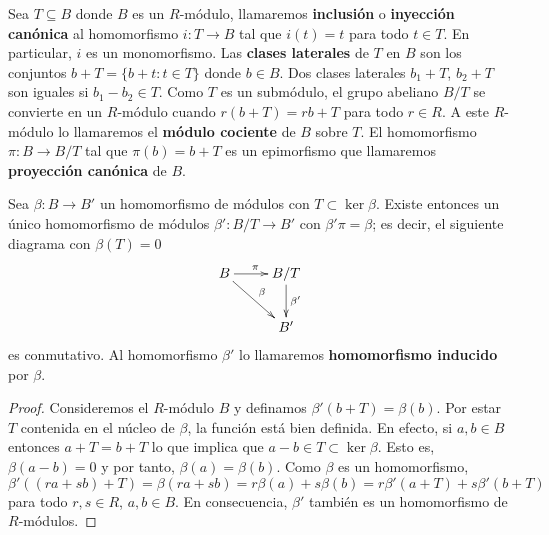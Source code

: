 Sea \(T \subseteq B\) donde \(B\) es un \(R\)-módulo, llamaremos \textbf{inclusión} o \textbf{inyección
canónica} al homomorfismo \(i: T \rightarrow B\) tal que \(i(t) = t\) para todo
\(t \in T\). En particular, \(i\) es un monomorfismo. Las \textbf{clases laterales}
de \(T\) en \(B\) son los conjuntos \(b + T = \{b + t : t \in T\}\) donde \(b \in B\). Dos
clases laterales \(b_{1} + T\), \(b_{2} + T\) son iguales si \(b_{1} - b_{2} \in T\). Como
\(T\) es un submódulo, el grupo abeliano \(B/T\) se convierte en un \(R\)-módulo
cuando \(r(b+T) = rb + T\) para todo \(r \in R\). A este \(R\)-módulo lo llamaremos el
\textbf{módulo cociente} de \(B\) sobre \(T\). El homomorfismo \(\pi: B \rightarrow B/
T\) tal que \(\pi(b) = b + T\) es un epimorfismo que llamaremos \textbf{proyección
canónica} de \(B\).

\begin{proposicion}
	 \label{prop:teo-fact} Sea \(\beta: B \rightarrow B'\)
	un homomorfismo de módulos con \(T \subset \ker \beta\). Existe entonces un
	único homomorfismo de módulos \(\beta': B/T \rightarrow B'\) con
	\(\beta'\pi = \beta\); es decir, el siguiente diagrama con \(\beta(T) = 0\)
	\begin{equation}
		\label{firstisothm}\xymatrix{ B \ar[r]^\pi \ar[dr]^\beta & B/T \ar[d]^{\beta'} \\ & B' }
	\end{equation}
	es conmutativo. Al homomorfismo \(\beta'\) lo llamaremos \textbf{homomorfismo
	inducido} por \(\beta\).
\end{proposicion}
\begin{proof}
	Consideremos el \(R\)-módulo \(B\) y definamos \(\beta'(b + T) = \beta(b)\). Por
	estar \(T\) contenida en el núcleo de \(\beta\), la función está bien definida. En
	efecto, si \(a,b \in B\) entonces \(a+T = b+T\) lo que implica que \(a-b \in T \subset
	\ker \beta\). Esto es, \(\beta(a-b) = 0\) y por tanto, \(\beta(a)=\beta(b)\). Como \(\beta\)
	es un homomorfismo,
	\[
		\beta'((ra + sb) + T) = \beta(ra+sb) = r\beta(a) + s\beta(b) = r \beta'(a+T)
		+ s \beta'(b+T)
	\]
	para todo \(r,s \in R\), \(a,b \in B\). En consecuencia, \(\beta'\) también es un homomorfismo
	de \(R\)-módulos.
\end{proof}
